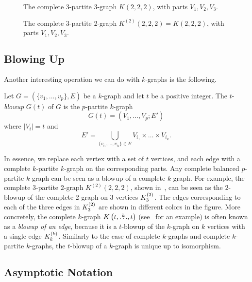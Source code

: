\begin{figure}[htbp]
    \centering
    
    \caption{The complete 3-partite 3-graph $K(2, 2, 2)$, with parts $V_1, V_2, V_3$.}
    \label{fig:222}
\end{figure}

\begin{figure}[htbp]
    \centering
    
    \caption{The complete 3-partite 2-graph $K^{(2)}(2, 2, 2) = K(2, 2, 2)$, with parts $V_1, V_2, V_3$.}
    \label{fig:k2_222}
\end{figure}

\subsection{Blowing Up} \label{subsec:blowup}
Another interesting operation we can do with $k$-graphs is the following.

\begin{definition}
    Let $G = (\{v_1, \dots, v_p\}, E)$ be a $k$-graph and let $t$ be a positive integer.
    The $t$-\emph{blowup} $G(t)$ of $G$ is the $p$-partite $k$-graph
    \[
        G(t) = (V_1, \dots, V_p; E')
    \]
    where $|V_i| = t$ and
    \[
        E' = \bigcup_{\{v_{i_1}, \dots, v_{i_k}\} \in E} V_{i_1} \times \dots \times V_{i_k}.
    \]
\end{definition}

In essence, we replace each vertex with a set of $t$ vertices, and each edge with a complete $k$-partite $k$-graph
on the corresponding parts.
Any complete balanced $p$-partite $k$-graph can be seen as a blowup of a complete $k$-graph.
For example, the complete $3$-partite $2$-graph $K^{(2)}(2, 2, 2)$, shown in~,
can be seen as the $2$-blowup of the complete $2$-graph on $3$ vertices $K^{(2)}_{3}$.
The edges corresponding to each of the three edges in $K^{(2)}_{3}$ are shown in different colors in the figure.
More concretely, the complete $k$-graph $K\left(t, \overset{k}{\dots}, t\right)$ (see~ for an example)
is often known as a \emph{blowup of an edge}, because it is a $t$-blowup of the
$k$-graph on $k$ vertices with a single edge $K^{(k)}_{k}$.
Similarly to the case of complete $k$-graphs and complete $k$-partite $k$-graphs,
the $t$-blowup of a $k$-graph is unique up to isomorphism.

\subsection{Asymptotic Notation}\label{subsec:asymptotic-notation} %

